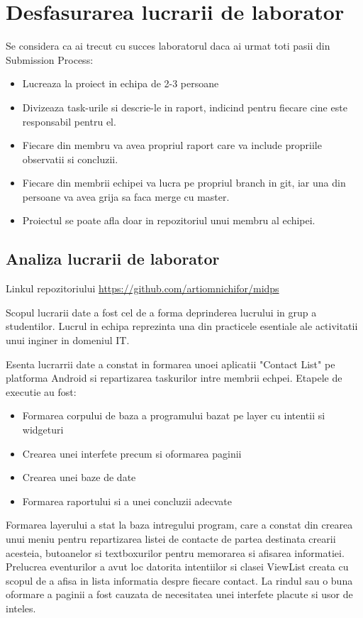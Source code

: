 \section{Desfasurarea lucrarii de laborator}

Se considera ca ai trecut cu succes laboratorul daca ai urmat toti pasii din Submission Process:
\begin{itemize}
	\item Lucreaza la proiect in echipa de 2-3 persoane
	\item Divizeaza task-urile si descrie-le in raport, indicind pentru fiecare cine este responsabil pentru el.
	\item Fiecare din membru va avea propriul raport care va include propriile observatii si concluzii.
	\item Fiecare din membrii echipei va lucra pe propriul branch in git, iar una din persoane va avea grija sa faca merge cu master.
	\item Proiectul se poate afla doar in repozitoriul unui membru al echipei.
\end{itemize}

\subsection{Analiza lucrarii de laborator}

	Linkul repozitoriului  \url{https://github.com/artiomnichifor/midps}

	Scopul lucrarii date a fost cel de a forma deprinderea lucrului in grup a studentilor. Lucrul in echipa reprezinta una din practicele esentiale ale activitatii unui inginer in domeniul IT.

	Esenta lucrarrii date a constat in formarea unoei aplicatii "Contact List" pe platforma Android si repartizarea taskurilor intre membrii echpei. Etapele de executie au fost: 
\begin{itemize}
	\item Formarea corpului de baza a programului bazat pe layer cu intentii si widgeturi
	\item Crearea unei interfete precum si oformarea paginii
	\item Crearea unei baze de date
	\item Formarea raportului si a unei concluzii adecvate
\end{itemize}

	 Formarea layerului a stat la baza intregului program, care a constat din crearea unui meniu pentru repartizarea listei de contacte de partea destinata crearii acesteia, butoanelor si textboxurilor pentru memorarea si afisarea informatiei. Prelucrea eventurilor a avut loc datorita intentiilor si clasei ViewList creata cu scopul de a afisa  in lista informatia despre fiecare contact. La rindul sau o buna oformare a paginii a fost cauzata de necesitatea unei interfete placute si usor de inteles. 


